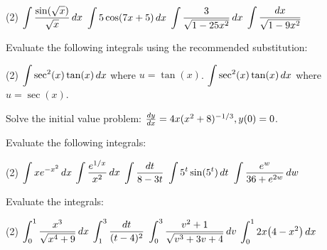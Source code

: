 \documentclass[mathNotesPreamble]{subfiles}
\begin{document}
  \begin{tasks}[after-item-skip=\stretch{1}, resume](2)
    \task $\ds\int \frac{\sin(\sqrt{x})}{\sqrt x}\,dx$
    \task $\ds\int 5\cos(7x+5)\,dx$
    \task $\ds\int \frac{3}{\sqrt{1-25x^2}}\,dx$
    \task $\ds\int \frac{dx}{\sqrt{1-9x^2}}$
  \end{tasks}
  \pagebreak
  \begin{ex*}
    Evaluate the following integrals using the recommended substitution:
  \end{ex*}
  \begin{tasks}(2)
    \task $\ds\int \sec^2(x)\tan(x)\,dx$ \newline where $u=\tan(x)$.
    \task $\ds\int \sec^2(x)\tan(x)\,dx$ \newline where $u=\sec(x)$.
  \end{tasks}
  \begin{ex*}
  Solve the initial value problem: $\frac{dy}{dx}=4x(x^2+8)\inv[1/3], y(0)=0$.
  \end{ex*}
  \pagebreak
  \begin{ex*}
    Evaluate the following integrals:
  \end{ex*}
  \begin{tasks}[after-item-skip=\stretch{1}](2)
    \task $\ds\int xe\inv[x^2]\,dx$
    \task $\ds\int \frac{e^{1/x}}{x^2}\,dx$
    \task $\ds\int \frac{dt}{8-3t}$
    \task $\ds\int 5^t\sin(5^t)\,dt$
    \task $\ds\int \frac{e^w}{36+e^{2w}}\,dw$
  \end{tasks}
  \pagebreak

  \noindent
  \begin{ex*}
    Evaluate the integrals:
  \end{ex*}
  \begin{tasks}[after-item-skip=\stretch{1}](2)
    \task $\ds\int_0^1 \frac{x^3}{\sqrt{x^4+9}}\,dx$
    \task $\ds\int_1^3 \frac{dt}{(t-4)^2}$
    \task $\ds\int_0^3 \frac{v^2+1}{\sqrt{v^3+3v+4}}\,dv$
    \task $\ds\int_0^1 2x\parens{4-x^2}\,dx$
  \end{tasks}
  \pagebreak
  
\end{document}
